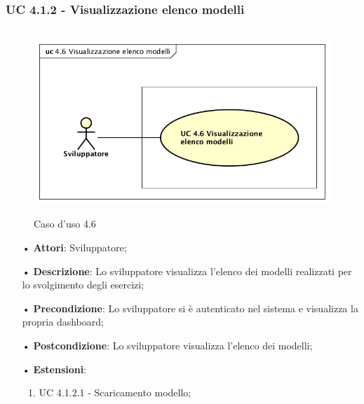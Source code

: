 \subsubsection{UC 4.1.2 - Visualizzazione elenco modelli}
\begin{figure}[H]
\centering
\includegraphics[width=17cm, height=7cm]{img/UC460.png} 
\caption{Caso d'uso 4.6}\label{fig:460}
\end{figure}
\begin{itemize}
\item[•]\textbf{Attori}: Sviluppatore;
\item[•]\textbf{Descrizione}: Lo sviluppatore visualizza l'elenco dei modelli realizzati per lo svolgimento degli esercizi;
\item[•]\textbf{Precondizione}: Lo sviluppatore si è autenticato nel sistema e visualizza la propria dashboard;
\item[•]\textbf{Postcondizione}: Lo sviluppatore visualizza l'elenco dei modelli;
\item[•]\textbf{Estensioni}:
\begin{enumerate}
\item UC 4.1.2.1 - Scaricamento modello;
\end{enumerate}
\end{itemize}

